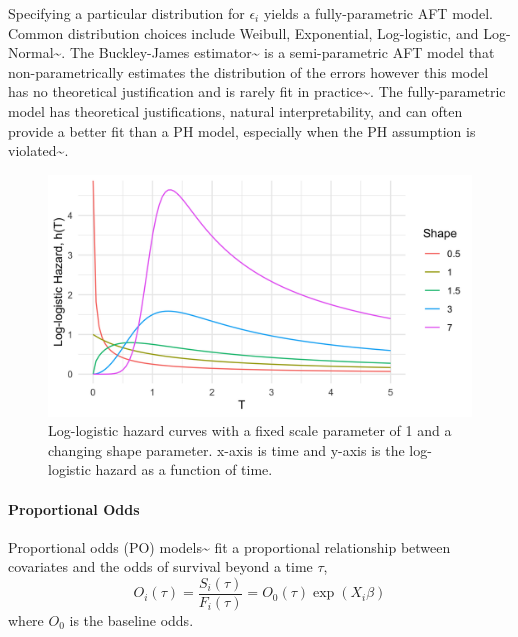 \documentclass[
  letterpaper,
]{scrbook}
\let\oldparagraph\paragraph
\renewcommand{\paragraph}[1]{\oldparagraph{#1}\mbox{}}
\theoremstyle{plain}
\theoremstyle{definition}
\theoremstyle{remark}
\begin{document}
Specifying a particular distribution for \(\epsilon_i\) yields a
fully-parametric AFT model. Common distribution choices include Weibull,
Exponential, Log-logistic, and
Log-Normal\textasciitilde{}\cite{Kalbfleisch2011, Wang2017}. The
Buckley-James estimator\textasciitilde{}\cite{Buckley1979} is a
semi-parametric AFT model that non-parametrically estimates the
distribution of the errors however this model has no theoretical
justification and is rarely fit in
practice\textasciitilde{}\cite{Wei1992}. The fully-parametric model has
theoretical justifications, natural interpretability, and can often
provide a better fit than a PH model, especially when the PH assumption
is violated\textasciitilde{}\cite{Patel2006, Qi2009, Zare2015}.

\begin{figure}

{\centering \includegraphics{./images/classical/llog_hazard.png}

}

\caption{\label{fig-litreview-logloghaz}Log-logistic hazard curves with
a fixed scale parameter of 1 and a changing shape parameter. x-axis is
time and y-axis is the log-logistic hazard as a function of time.}

\end{figure}

\paragraph{Proportional Odds}

Proportional odds (PO) models\textasciitilde{}\cite{Bennett1983} fit a
proportional relationship between covariates and the odds of survival
beyond a time \(\tau\), \[
O_i(\tau) = \frac{S_i(\tau)}{F_i(\tau)} = O_0(\tau)\exp(X_i\beta)
\] where \(O_0\) is the baseline odds.
\end{document}
